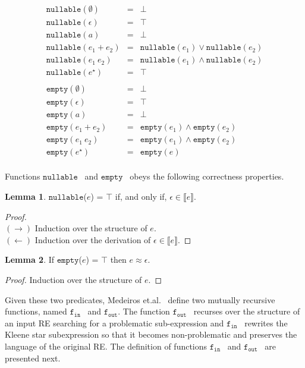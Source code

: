 \documentclass[review]{elsarticle}
\newcommand{\sembrackets}[1]{\ensuremath{\llbracket #1 \rrbracket}}
\newcommand{\nullable}{\ensuremath{\texttt{nullable}}}
\newcommand{\emptyy}{\ensuremath{\texttt{empty}}}
\newcommand{\fin}{\ensuremath{\texttt{f$_{\texttt{in}}$}}}
\newcommand{\fout}{\ensuremath{\texttt{f$_{\texttt{out}}$}}}
\theoremstyle{definition}
\newtheorem{Lemma}{Lemma}
\begin{document}
\[
\begin{array}{lcl}
   \nullable(\emptyset) & = & \bot \\ 
   \nullable(\epsilon)  & = & \top \\
   \nullable(a)         & = & \bot \\ 
   \nullable(e_1 + e_2) & = & \nullable(e_1)\lor\nullable(e_2)\\
   \nullable(e_1\:e_2)  & = & \nullable(e_1)\land\nullable(e_2)\\
   \nullable(e ^\star)  & = & \top \\
   \\
   \emptyy(\emptyset)    & = & \bot \\ 
   \emptyy(\epsilon)     & = & \top \\
   \emptyy(a)            & = & \bot \\
   \emptyy(e_1 + e_2)    & = & \emptyy(e_1) \land \emptyy(e_2)\\
   \emptyy(e_1\:e_2)     & = & \emptyy(e_1) \land \emptyy(e_2)\\
   \emptyy(e ^\star)     & = & \emptyy(e)\\        
\end{array}
\]

Functions \nullable~ and \emptyy~ obeys the following correctness properties.


\begin{Lemma}
   \nullable($e$) = $\top$ if, and only if, $\epsilon\in\sembrackets{e}$.
\end{Lemma}
\begin{proof}$\,$\\
  $(\to)$ Induction over the structure of $e$. \\$(\leftarrow)$ Induction over the derivation of $\epsilon \in\sembrackets{e}$.
\end{proof}

\begin{Lemma}
   If \emptyy($e$) = $\top$ then $e \approx \epsilon$.
\end{Lemma}
\begin{proof}
   Induction over the structure of $e$.
\end{proof}


Given these two predicates, Medeiros et.al.~\cite{Medeiros14} define two mutually recursive functions,
named \fin~ and \fout. The function \fout~ recurses over the structure of an input RE
searching for a problematic sub-expression and \fin~ rewrites the Kleene star subexpression
so that it becomes non-problematic and preserves the language of the original 
RE. The definition of functions \fin~ and \fout~ are presented next.
\end{document}
